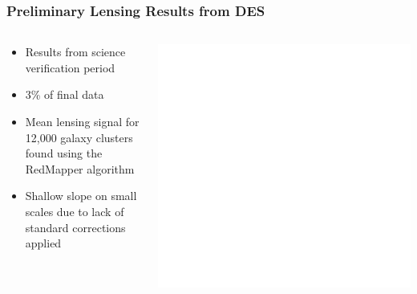 \documentclass{beamer}
\begin{document}
\frame
{

    \frametitle{Preliminary Lensing Results from DES}

 
    \begin{columns}
        \begin{column}{0.5\textwidth}    
            \begin{itemize}

                \item Results from science verification period

                \item 3\% of final data

                \item Mean lensing signal for 12,000 galaxy clusters found
                    using the RedMapper algorithm

                \item Shallow slope on small scales due to lack of standard
                    corrections applied

            \end{itemize}
        \end{column}
        \begin{column}{0.5\textwidth}
                \centering
                \includegraphics[width=\textwidth]{run-rm008-bin-zwide-jack-icolor.pdf}
                \newline
        \end{column}
    \end{columns}

}
\end{document}
